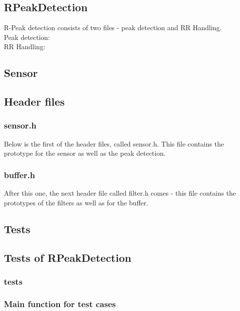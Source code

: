 \documentclass[12pt,a4paper]{article}
\begin{document}
\subsection{RPeakDetection}
	R-Peak detection consists of two files - peak detection and RR Handling.\\
	Peak detection:\\
		
	RR Handling:\\
		
\subsection{Sensor}
		
\subsection{Header files}
\subsubsection{sensor.h}
	Below is the first of the header files, called sensor.h. This file contains the prototype for the sensor as well as the peak detection.\\
	
\subsubsection{buffer.h}
	After this one, the next header file called filter.h comes - this file contains the prototypes of the filters as well as for the buffer.\\
	
\subsection{Tests}
\subsection{Tests of RPeakDetection}
%	
\subsubsection{tests}
%	
\subsubsection{Main function for test cases}
%	
\end{document}
